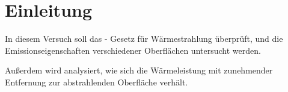 
\section{Einleitung}
%
In diesem Versuch soll das - Gesetz für
Wärmestrahlung überprüft, und die Emissionseigenschaften verschiedener
Oberflächen untersucht werden.

Außerdem wird analysiert, wie sich die Wärmeleistung mit zunehmender
Entfernung zur abstrahlenden Oberfläche verhält.
